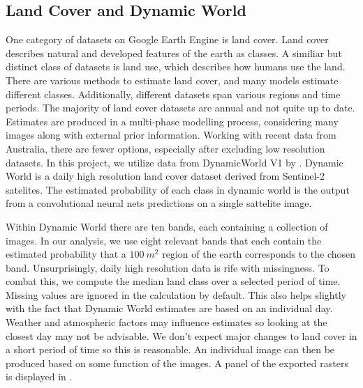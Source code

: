 \documentclass[
  12pt,
  letterpaper,
  DIV=11,
  numbers=noendperiod]{scrartcl}
\begin{document}
\subsection{Land Cover and Dynamic
World}\label{land-cover-and-dynamic-world}

One category of datasets on Google Earth Engine is land cover. Land
cover describes natural and developed features of the earth as classes.
A similiar but distinct class of datasets is land use, which describes
how humans use the land. There are various methods to estimate land
cover, and many models estimate different classes. Additionally,
different datasets span various regions and time periods. The majority
of land cover datasets are annual and not quite up to date. Estimates
are produced in a multi-phase modelling process, considering many images
along with external prior information. Working with recent data from
Australia, there are fewer options, especially after excluding low
resolution datasets. In this project, we utilize data from DynamicWorld
V1 by \citep{dynamic_world}. Dynamic World is a daily high resolution
land cover dataset derived from Sentinel-2 satelites. The estimated
probability of each class in dynamic world is the output from a
convolutional neural nets predictions on a single sattelite image.

Within Dynamic World there are ten bands, each containing a collection
of images. In our analysis, we use eight relevant bands that each
contain the estimated probability that a \(100\ m^2\) region of the
earth corresponds to the chosen band. Unsurprisingly, daily high
resolution data is rife with missingness. To combat this, we compute the
median land class over a selected period of time. Missing values are
ignored in the calculation by default. This also helps slightly with the
fact that Dynamic World estimates are based on an individual day.
Weather and atmospheric factors may influence estimates so looking at
the closest day may not be advisable. We don't expect major changes to
land cover in a short period of time so this is reasonable. An
individual image can then be produced based on some function of the
images. A panel of the exported rasters is displayed in \citet{dw_lc}.
\end{document}

